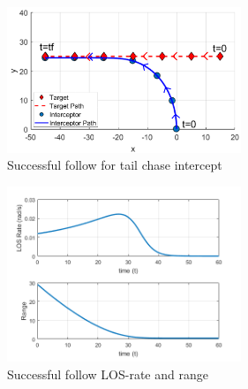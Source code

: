 \documentclass[conference]{IEEEtran}
\providecommand{\DIFdelbegin}{} %
\newcommand{\DIFscaledelfig}{0.5}
\newlength{\DIFdelgraphicswidth} %
\newlength{\DIFdelgraphicsheight} %
\newcommand{\DIFdelincludegraphics}[2][]{%
\sbox{\DIFdelgraphicsbox}{\DIFOincludegraphics[#1]{#2}}%
\settoboxwidth{\DIFdelgraphicswidth}{\DIFdelgraphicsbox} %
\settoboxtotalheight{\DIFdelgraphicsheight}{\DIFdelgraphicsbox} %
\scalebox{\DIFscaledelfig}{%
\parbox[b]{\DIFdelgraphicswidth}{\usebox{\DIFdelgraphicsbox}\\[-\baselineskip] \rule{\DIFdelgraphicswidth}{0em}}\llap{\resizebox{\DIFdelgraphicswidth}{\DIFdelgraphicsheight}{%
\setlength{\unitlength}{\DIFdelgraphicswidth}%
\begin{picture}(1,1)%
\thicklines\linethickness{2pt} %
{\color[rgb]{1,0,0}\put(0,0){\framebox(1,1){}}}%
{\color[rgb]{1,0,0}\put(0,0){\line( 1,1){1}}}%
{\color[rgb]{1,0,0}\put(0,1){\line(1,-1){1}}}%
\end{picture}%
}\hspace*{3pt}}} %
} %
\DeclareRobustCommand{\DIFdelbegin}{\DIFOdelbegin \let\includegraphics\DIFdelincludegraphics} %
\begin{document}
\begin{figure}[H]
	\centering
	\includegraphics[width=7cm] {tailChaseWithLedgend}
	\caption{Successful follow for tail chase intercept}
	\label{fig:successfulFollow}
	\hspace*{0mm}
\end{figure}

\begin{figure}[H]
	\centering
	\includegraphics[width=7cm] {x15_range_LOSrate}
	\caption{Successful follow LOS-rate and range}
	\label{fig:successfulFollowLOS}
		\hspace*{0mm}
\end{figure}



\DIFdelbegin %

\end{document}
